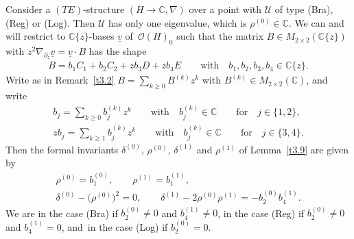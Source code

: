 \documentclass[10pt,a4paper]{amsart}
\numberwithin{equation}{section}
\numberwithin{figure}{section}
\newcommand{\C}{{\mathbb C}}
\newcommand{\OO}{{\mathcal O}}
\newcommand{\UU}{{\mathcal U}}
\newcommand{\uuuu}{\underline}
\newcommand{\paa}{\partial}
\newcommand{\nnn}{\nabla}
\begin{document}
Consider a $(TE)$-structure $(H\to\C,\nnn)$
over a point with $\UU$ of type (Bra), (Reg) or (Log).
Then $\UU$ has only one eigenvalue, which is $\rho^{(0)}\in\C$.
We can and will restrict to $\C\{z\}$-bases $\uuuu{v}$
of~$\OO(H)_0$ such that the matrix
$B\in M_{2\times 2}(\C\{z\})$ with
$z^2\nnn_{\paa_z}\uuuu{v}=\uuuu{v}\cdot B$ has the shape
\begin{gather}\label{4.13}
B= b_1C_1+b_2C_2+zb_3D+zb_4E\qquad\text{with}\quad
b_1,b_2,b_3,b_4\in\C\{z\}.
\end{gather}
Write as in Remark~\ref{t3.2} $B=\sum_{k\geq 0}B^{(k)}z^k$
with $B^{(k)}\in M_{2\times 2}(\C)$, and write
\begin{gather}\label{4.14}
b_j=\sum_{k\geq 0}b_j^{(k)}z^k\qquad\text{with}\quad
b_j^{(k)}\in\C\qquad\text{for}\quad j\in\{1,2\},
\\
zb_j=\sum_{k\geq 1}b_j^{(k)}z^{k}\qquad\text{with}\quad
b_j^{(k)}\in\C\qquad\text{for}\quad j\in\{3,4\}.\label{4.15}
\end{gather}
Then the formal invariants $\delta^{(0)}$, $\rho^{(0)}$,
$\delta^{(1)}$ and $\rho^{(1)}$ of Lemma~\ref{t3.9} are
given by
\begin{gather*}%
\rho^{(0)}=b_1^{(0)},\qquad \rho^{(1)}=b_1^{(1)},
\\
\delta^{(0)}-\big(\rho^{(0)}\big)^2=0,\qquad
\delta^{(1)}-2\rho^{(0)}\rho^{(1)}= -b_2^{(0)}b_4^{(1)}.%
\end{gather*}
We are in the case (Bra) if $b_2^{(0)}\neq 0$ and
$b_4^{(1)}\neq 0$, in the case (Reg) if $b_2^{(0)}\neq 0$
and $b_4^{(1)}=0$,
and~in the case (Log) if $b_2^{(0)}=0$.
\end{document}
